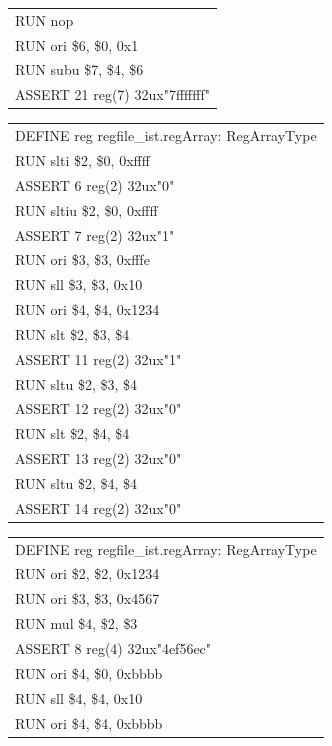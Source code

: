 \documentclass[11pt,utf8]{article}
\begin{document}
{{{\begin{center}
\begin{longtable}{p{15cm}}
		RUN{ }nop\\
		RUN{ }ori{ }\$6,{ }\$0,{ }0x1\\
		RUN{ }subu{ }\$7,{ }\$4,{ }\$6\\
		ASSERT{ }21{ }reg(7){ }32ux"7fffffff"\\
		\hline \end{longtable} \end{center}
\begin{center}	\begin{longtable}{p{15cm}} \hline
		DEFINE{ }reg{ }regfile\_ist.regArray:{ }RegArrayType\\
		RUN{ }slti{ }\$2,{ }\$0,{ }0xffff\\
		ASSERT{ }6{ }reg(2){ }32ux"0"\\
		RUN{ }sltiu{ }\$2,{ }\$0,{ }0xffff\\
		ASSERT{ }7{ }reg(2){ }32ux"1"\\
		RUN{ }ori{ }\$3,{ }\$3,{ }0xfffe\\
		RUN{ }sll{ }\$3,{ }\$3,{ }0x10\\
		RUN{ }ori{ }\$4,{ }\$4,{ }0x1234\\
		RUN{ }slt{ }\$2,{ }\$3,{ }\$4\\
		ASSERT{ }11{ }reg(2){ }32ux"1"\\
		RUN{ }sltu{ }\$2,{ }\$3,{ }\$4\\
		ASSERT{ }12{ }reg(2){ }32ux"0"\\
		RUN{ }slt{ }\$2,{ }\$4,{ }\$4\\
		ASSERT{ }13{ }reg(2){ }32ux"0"\\
		RUN{ }sltu{ }\$2,{ }\$4,{ }\$4\\
		ASSERT{ }14{ }reg(2){ }32ux"0"\\
		\hline \end{longtable} \end{center}
\begin{center}	\begin{longtable}{p{15cm}} \hline
		DEFINE{ }reg{ }regfile\_ist.regArray:{ }RegArrayType\\
		RUN{ }ori{ }\$2,{ }\$2,{ }0x1234\\
		RUN{ }ori{ }\$3,{ }\$3,{ }0x4567\\
		RUN{ }mul{ }\$4,{ }\$2,{ }\$3\\
		ASSERT{ }8{ }reg(4){ }32ux"4ef56ec"\\
		RUN{ }ori{ }\$4,{ }\$0,{ }0xbbbb\\
		RUN{ }sll{ }\$4,{ }\$4,{ }0x10\\
		RUN{ }ori{ }\$4,{ }\$4,{ }0xbbbb\\

\end{longtable}
\end{center}}}}
\end{document}
